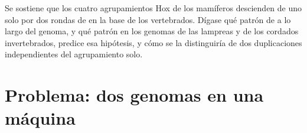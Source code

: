 \begin{exercise}[$\star\star\star$]\label{exo:b3:genomics:12}
Se sostiene que los cuatro agrupamientos Hox de los mamíferos descienden
de uno solo por dos rondas de  en la base
de los vertebrados. Dígase qué patrón de  a lo largo del genoma,
y qué patrón en los genomas de las lampreas y de los cordados
invertebrados, predice esa hipótesis, y cómo se la distinguiría de dos
duplicaciones independientes del agrupamiento solo.
\end{exercise}

\section{Problema: dos genomas en una máquina}

